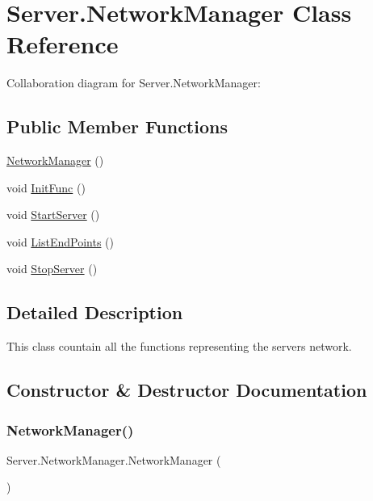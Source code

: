 \hypertarget{class_server_1_1_network_manager}{}\section{Server.\+Network\+Manager Class Reference}
\label{class_server_1_1_network_manager}


Collaboration diagram for Server.\+Network\+Manager\+:
\subsection*{Public Member Functions}
\begin{DoxyCompactItemize}
\item 
\hyperlink{class_server_1_1_network_manager_a5878a8029cf8a10d11ffa8499964c64e}{Network\+Manager} ()
\item 
void \hyperlink{class_server_1_1_network_manager_aa9931aac194e294e9ac6314a5514c4a5}{Init\+Func} ()
\item 
void \hyperlink{class_server_1_1_network_manager_a3c944be5c69dcf9723ae81db78188fa8}{Start\+Server} ()
\item 
void \hyperlink{class_server_1_1_network_manager_a1e4686ebadc475d031229accd6cad3de}{List\+End\+Points} ()
\item 
void \hyperlink{class_server_1_1_network_manager_a0402543b544a9688c3f0f73df5dbcdbd}{Stop\+Server} ()
\end{DoxyCompactItemize}


\subsection{Detailed Description}
This class countain all the functions representing the server\textquotesingle{}s network. 

\subsection{Constructor \& Destructor Documentation}
\mbox{\label{class_server_1_1_network_manager_a5878a8029cf8a10d11ffa8499964c64e}} 
\subsubsection{\texorpdfstring{Network\+Manager()}{NetworkManager()}}
{\footnotesize\ttfamily Server.\+Network\+Manager.\+Network\+Manager (\begin{DoxyParamCaption}{ }\end{DoxyParamCaption})\hspace{0.3cm}{\ttfamily [inline]}}

